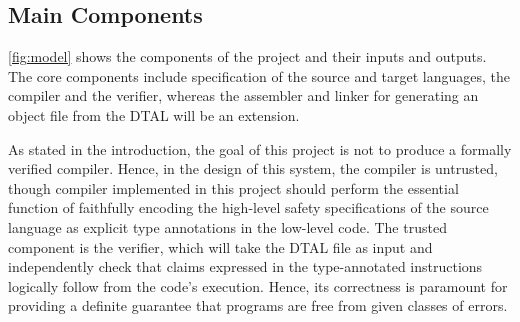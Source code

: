\documentclass[a4paper, 12pt]{article}
\begin{document}
\subsection{Main Components}

\autoref{fig:model} shows the components of the project and their inputs and outputs. The core components include specification of the source and target languages, the compiler and the verifier, whereas the assembler and linker for generating an object file from the DTAL will be an extension.

As stated in the introduction, the goal of this project is not to produce a formally verified compiler. Hence, in the design of this system, the compiler is untrusted, though compiler implemented in this project should perform the essential function of faithfully encoding the high-level safety specifications of the source language as explicit type annotations in the low-level code. The trusted component is the verifier, which will take the DTAL file as input and independently check that claims expressed in the type-annotated instructions logically follow from the code's execution. Hence, its correctness is paramount for providing a definite guarantee that programs are free from given classes of errors.
\end{document}
